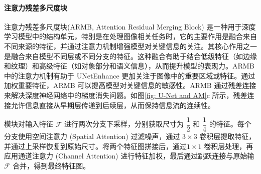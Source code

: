 \documentclass[a4paper]{ctexart}
\begin{document}
%	
%	
%	
%	
%	
%	
	
	\paragraph{注意力残差多尺度块}
	
	注意力残差多尺度块(ARMB, Attention Residual Merging Block) 是一种用于深度学习模型中的结构单元，特别是在处理图像相关任务时，它的主要作用是融合来自不同来源的特征，并通过注意力机制增强模型对关键信息的关注。其核心作用之一是融合来自模型不同层或不同分支的特征。这种融合有助于结合低级特征（如边缘和纹理）和高级特征（如对象部分和语义信息），从而提升模型的表现力。ARMB 中的注意力机制有助于 UNetEnhance 更加关注于图像中的重要区域或特征。通过加权重要特征，ARMB 可以提高模型对关键信息的敏感性。ARMB 通过残差连接来解决深度神经网络中的梯度消失问题。如图\ref{fig: U-Net and AM}c 所示，残差连接允许信息直接从早期层传递到后续层，从而保持信息流的连续性。
	
	模块对输入特征 $\mathcal{F}$ 进行两次分支下采样，分别获取尺寸为 $\dfrac{1}{2}$ 和 $\dfrac{1}{4}$ 的特征。每个分支使用空间注意力 (Spatial Attention) 过滤噪声，通过 $3 \times 3$ 卷积层提取特征，并通过上采样恢复到原始尺寸。将两个特征图拼接后，通过$ 1 \times 1$ 卷积层处理，再应用通道注意力 (Channel Attention) 进行特征加权，最后通过跳跃连接与原始输 $\mathcal{F}$ 合并，得到最终特征图。
	
\end{document}
